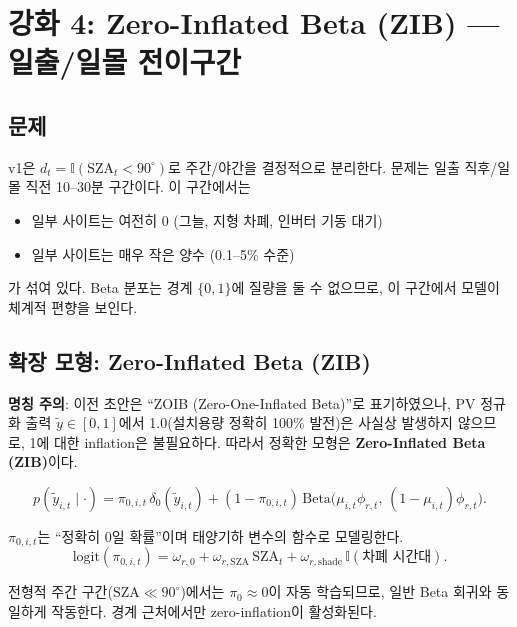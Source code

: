 \documentclass[11pt,a4paper]{article}
\begin{document}
\section{강화 4: Zero-Inflated Beta (ZIB) --- 일출/일몰 전이구간}

\subsection{문제}

v1은 $d_t = \mathbb{I}(\mathrm{SZA}_t<90^\circ)$로 주간/야간을 결정적으로 분리한다. 문제는 일출 직후/일몰 직전 10--30분 구간이다. 이 구간에서는
\begin{itemize}[leftmargin=2em]
    \item 일부 사이트는 여전히 0 (그늘, 지형 차폐, 인버터 기동 대기)
    \item 일부 사이트는 매우 작은 양수 (0.1--5\% 수준)
\end{itemize}
가 섞여 있다. Beta 분포는 경계 $\{0,1\}$에 질량을 둘 수 없으므로, 이 구간에서 모델이 체계적 편향을 보인다.

\subsection{확장 모형: Zero-Inflated Beta (ZIB)}

\textbf{명칭 주의}: 이전 초안은 ``ZOIB (Zero-One-Inflated Beta)''로 표기하였으나, PV 정규화 출력 $\tilde y\in[0,1]$에서 1.0(설치용량 정확히 100\% 발전)은 사실상 발생하지 않으므로, 1에 대한 inflation은 불필요하다. 따라서 정확한 모형은 \textbf{Zero-Inflated Beta (ZIB)}이다.

\begin{equation}
    p(\tilde y_{i,t}\mid\cdot) = \pi_{0,i,t}\,\delta_0(\tilde y_{i,t}) + (1-\pi_{0,i,t})\,\mathrm{Beta}\bigl(\mu_{i,t}\phi_{r,t},\,(1-\mu_{i,t})\phi_{r,t}\bigr).
    \label{eq:zib}
\end{equation}

$\pi_{0,i,t}$는 ``정확히 0일 확률''이며 태양기하 변수의 함수로 모델링한다.
\begin{equation}
    \mathrm{logit}(\pi_{0,i,t}) = \omega_{r,0} + \omega_{r,\mathrm{SZA}}\,\mathrm{SZA}_t + \omega_{r,\mathrm{shade}}\,\mathbb{I}(\text{차폐 시간대}).
\end{equation}

전형적 주간 구간($\mathrm{SZA}\ll 90^\circ$)에서는 $\pi_0\approx 0$이 자동 학습되므로, 일반 Beta 회귀와 동일하게 작동한다. 경계 근처에서만 zero-inflation이 활성화된다.
\end{document}
